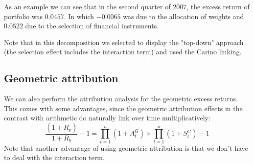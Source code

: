 \documentclass[11pt,a4paper]{article}
\begin{document}
As an example we can see that in the second quarter of $2007$, the excess return of portfolio was $0.0457$. In which $-0.0065$ was due to the allocation of weights and $0.0522$ due to the selection of financial instruments.

Note that in this decomposition we selected to display the "top-down" approach (the selection effect includes the interaction term) and used the Carino linking.

\subsection{Geometric attribution}
We can also perform the attribution analysis for the geometric excess returns. This comes with some advantages, since the geometric attribution effects in the contrast with arithmetic do naturally link over time multiplicatively:
\[
  \frac{(1+R_{p})}{1+R_{b}}-1 = \prod^{n}_{t=1}(1+A_{t}^{G}) \times \prod^{n}_{t=1}(1+S{}_{t}^{G})-1
\]
Note that another advantage of using geometric attribution is that we don't have to deal with the interaction term.
\end{document}
